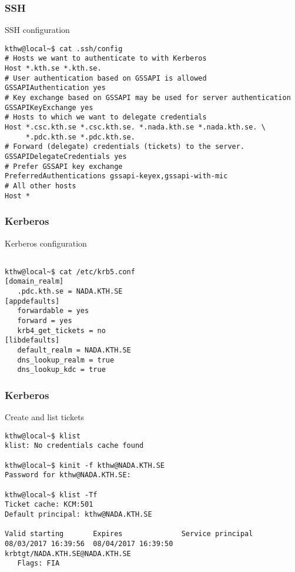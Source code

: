 \begin{frame}[fragile]
  \frametitle{SSH}
  \begin{alertblock}{SSH configuration}
    \verbatimfont{\footnotesize}
    \begin{verbatim}
kthw@local~$ cat .ssh/config
# Hosts we want to authenticate to with Kerberos
Host *.kth.se *.kth.se.
# User authentication based on GSSAPI is allowed
GSSAPIAuthentication yes
# Key exchange based on GSSAPI may be used for server authentication
GSSAPIKeyExchange yes
# Hosts to which we want to delegate credentials
Host *.csc.kth.se *.csc.kth.se. *.nada.kth.se *.nada.kth.se. \
     *.pdc.kth.se *.pdc.kth.se.
# Forward (delegate) credentials (tickets) to the server.
GSSAPIDelegateCredentials yes
# Prefer GSSAPI key exchange
PreferredAuthentications gssapi-keyex,gssapi-with-mic
# All other hosts
Host *

 \end{verbatim}
\end{alertblock}

\end{frame}


\begin{frame}[fragile]
  \frametitle{Kerberos}
  \begin{alertblock}{Kerberos configuration}
    \verbatimfont{\footnotesize}
    \begin{verbatim}

kthw@local~$ cat /etc/krb5.conf
[domain_realm]
   .pdc.kth.se = NADA.KTH.SE
[appdefaults]
   forwardable = yes
   forward = yes
   krb4_get_tickets = no
[libdefaults]
   default_realm = NADA.KTH.SE
   dns_lookup_realm = true
   dns_lookup_kdc = true

 \end{verbatim}
\end{alertblock}

\end{frame}



\begin{frame}[fragile]
  \frametitle{Kerberos}
  \begin{alertblock}{Create and list tickets}
    \verbatimfont{\footnotesize}
    \begin{verbatim}
kthw@local~$ klist
klist: No credentials cache found
      
kthw@local~$ kinit -f kthw@NADA.KTH.SE
Password for kthw@NADA.KTH.SE:

kthw@local~$ klist -Tf  
Ticket cache: KCM:501
Default principal: kthw@NADA.KTH.SE

Valid starting       Expires              Service principal
08/03/2017 16:39:56  08/04/2017 16:39:50  krbtgt/NADA.KTH.SE@NADA.KTH.SE
   Flags: FIA

  \end{verbatim}
  \end{alertblock}

\end{frame}


